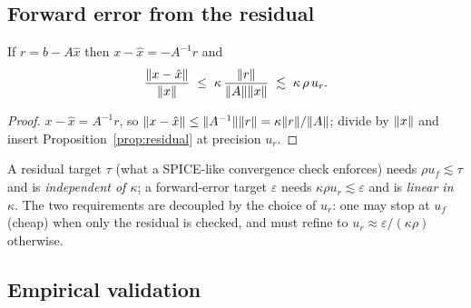 \subsection{Forward error from the residual}

\begin{proposition}\label{prop:forward}
If $r=b-A\hat x$ then $x-\hat x=-A^{-1}r$ and
\begin{equation}
  \frac{\lVert x-\hat x \rVert}{\lVert x \rVert}
  \;\le\; \kappa\,\frac{\lVert r \rVert}{\lVert A \rVert\lVert x \rVert}
  \;\lesssim\; \kappa\,\rho\,u_r .
\end{equation}
\end{proposition}

\begin{proof}
$x-\hat x=A^{-1}r$, so $\lVert x-\hat x \rVert\le\lVert A^{-1} \rVert\lVert r \rVert
=\kappa\lVert r \rVert/\lVert A \rVert$; divide by $\lVert x \rVert$ and insert
Proposition~\ref{prop:residual} at precision $u_r$.
\end{proof}

\begin{corollary}\label{cor:targets}
A residual target $\tau$ (what a SPICE-like convergence check enforces) needs
$\rho u_f\lesssim\tau$ and is \emph{independent of $\kappa$};
a forward-error target $\varepsilon$ needs $\kappa\rho u_r\lesssim\varepsilon$
and is \emph{linear in $\kappa$}. The two requirements are decoupled by the
choice of $u_r$: one may stop at $u_f$ (cheap) when only the residual is
checked, and must refine to $u_r\approx\varepsilon/(\kappa\rho)$ otherwise.
\end{corollary}

\subsection{Empirical validation}

